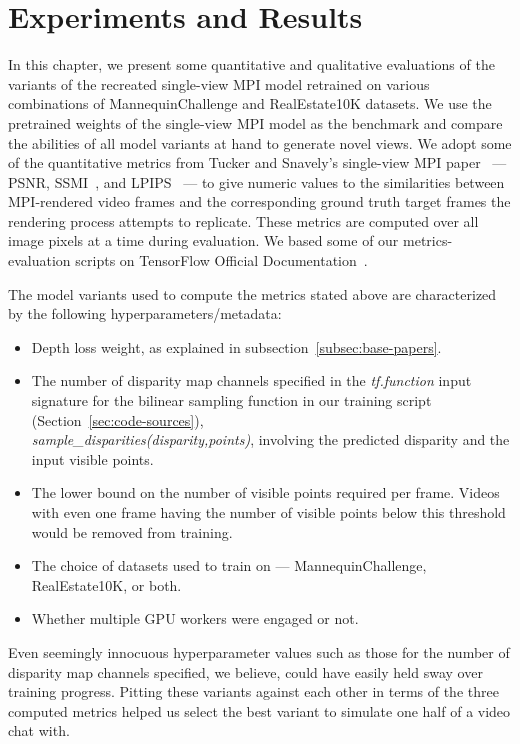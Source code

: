 \chapter{Experiments and Results}\label{ch4:experiments-results}

In this chapter, we present some quantitative and qualitative evaluations of the variants of the recreated single-view MPI model retrained on various combinations of MannequinChallenge and RealEstate10K datasets. We use the pretrained weights of the single-view MPI model as the benchmark and compare the abilities of all model variants at hand to generate novel views. We adopt some of the quantitative metrics from Tucker and Snavely's single-view MPI paper~\cite{single_view_mpi} --- PSNR, SSMI~\cite{wang_image_2004}, and LPIPS~\cite{zhang_unreasonable_2018} --- to give numeric values to the similarities between MPI-rendered video frames and the corresponding ground truth target frames the rendering process attempts to replicate. These metrics are computed over all image pixels at a time during evaluation. We based some of our metrics-evaluation scripts on TensorFlow Official Documentation~\cite{noauthor_tfimagepsnr_nodate,noauthor_tfimagessim_nodate}.

The model variants used to compute the metrics stated above are characterized by the following hyperparameters/metadata:
\begin{itemize}
    \item Depth loss weight, as explained in subsection~\ref{subsec:base-papers}.
    \item The number of disparity map channels specified in the \textit{tf.function} input signature for the bilinear sampling function in our training script (Section~\ref{sec:code-sources}),\\\textit{sample\_disparities(disparity,points)}, involving the predicted disparity and the input visible points.
    \item The lower bound on the number of visible points required per frame. Videos with even one frame having the number of visible points below this threshold would be removed from training.
    \item The choice of datasets used to train on --- MannequinChallenge, RealEstate10K, or both.
    \item Whether multiple GPU workers were engaged or not.
\end{itemize}
Even seemingly innocuous hyperparameter values such as those for the number of disparity map channels specified, we believe, could have easily held sway over training progress. Pitting these variants against each other in terms of the three computed metrics helped us select the best variant to simulate one half of a video chat with.

